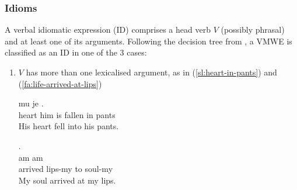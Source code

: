 \documentclass[output=paper,
modfonts,
]{langscibook}
\begin{document}
\subsubsection{Idioms}
\label{sec:ids}
%
A verbal idiomatic expression (ID) comprises a head verb $V$ (possibly phrasal) and at least one of its arguments. Following the decision tree from , a VMWE is classified as an ID in one of the 3 cases:
\begin{enumerate}
\item\label{many-lex-arg} $V$ has more than one lexicalised argument, as in (\ref{sl:heart-in-pants}) and (\ref{fa:life-arrived-at-lips})


\ea \label{sl:heart-in-pants}
\settowidth {}
\gll {} mu je   . \\
heart him is fallen in pants\\ 
\glt His heart fell into his pants. 
\z

\ea \label{fa:life-arrived-at-lips}
\settowidth {}
\glll . \underline{}  \underline{}  \underline{} \\
 am  am\\
arrived lips-my to soul-my\\ 
\glt My soul arrived at my lips. 
\z




\end{enumerate}
\end{document}
